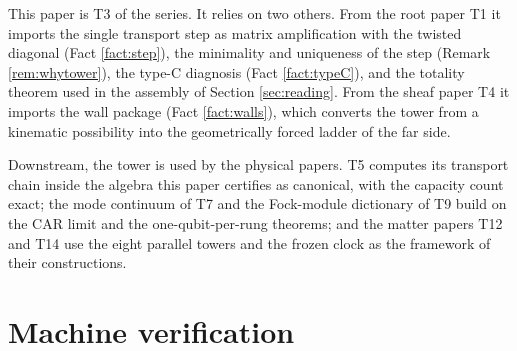 \documentclass[11pt]{article}
\theoremstyle{definition}
\begin{document}
This paper is T3 of the series. It relies on two others. From the root paper T1 \cite{ButlerT1} it imports the single transport step as matrix amplification with the twisted diagonal (Fact \ref{fact:step}), the minimality and uniqueness of the step (Remark \ref{rem:whytower}), the type-C diagnosis (Fact \ref{fact:typeC}), and the totality theorem used in the assembly of Section \ref{sec:reading}. From the sheaf paper T4 \cite{ButlerT4} it imports the wall package (Fact \ref{fact:walls}), which converts the tower from a kinematic possibility into the geometrically forced ladder of the far side.

Downstream, the tower is used by the physical papers. T5 \cite{ButlerT5} computes its transport chain inside the algebra this paper certifies as canonical, with the capacity count exact; the mode continuum of T7 \cite{ButlerT7} and the Fock-module dictionary of T9 \cite{ButlerT9} build on the CAR limit and the one-qubit-per-rung theorems; and the matter papers T12 \cite{ButlerT12} and T14 \cite{ButlerT14} use the eight parallel towers and the frozen clock as the framework of their constructions.

\section{Machine verification}\label{sec:verification}
\end{document}
